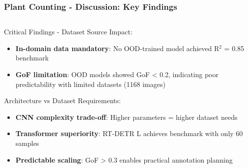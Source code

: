 \documentclass[aspectratio=43]{beamer}
\begin{document}
\begin{frame}
    \frametitle{Plant Counting - Discussion: Key Findings}
    
    \begin{columns}
        \begin{column}{0.5\textwidth}
            \begin{block}{Critical Findings - Dataset Source Impact:}
                \scriptsize
                \begin{itemize}
                    \item \textbf{In-domain data mandatory}: No OOD-trained model achieved R\ensuremath{^2} = 0.85 benchmark
                    \item \textbf{GoF limitation}: OOD models showed GoF < 0.2, indicating poor predictability with limited datasets (1168 images)
                \end{itemize}
            \end{block}
            
            \begin{exampleblock}{Architecture vs Dataset Requirements:}
                \scriptsize
                \begin{itemize}
                    \item \textbf{CNN complexity trade-off}: Higher parameters = higher dataset needs
                    \item \textbf{Transformer superiority}: RT-DETR L achieves benchmark with only 60 samples 
                    \item \textbf{Predictable scaling}: GoF > 0.3 enables practical annotation planning
                \end{itemize}
            \end{exampleblock}
            
        \end{column}
        

\end{columns}
\end{frame}
\end{document}
